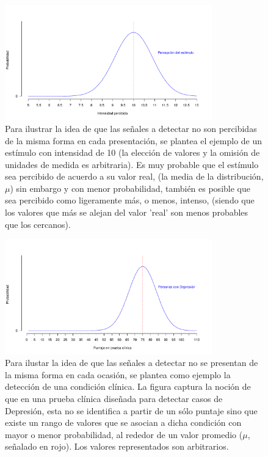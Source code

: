 \begin{itemize}
\begin{itemize}
\begin{figure}[th]
\centering
\includegraphics[width=0.80\textwidth]{Figures/Signal_Perception} 
\caption[Variabilidad en la percepción de los estímulos]{Para ilustrar la idea de que las señales a detectar no son percibidas de la misma forma en cada presentación, se plantea el ejemplo de un estímulo con intensidad de 10 (la elección de valores y la omisión de unidades de medida es arbitraria). Es muy probable que el estímulo sea percibido de acuerdo a su valor real, (la media de la distribución, $\mu$) sin embargo y con menor probabilidad, también es posible que sea percibido como ligeramente más, o menos, intenso, (siendo que los valores que más se alejan del valor 'real' son menos probables que los cercanos).}
\label{fig:Senal_percepcion}
\end{figure}

\begin{figure}[th]
\centering
\includegraphics[width=0.80\textwidth]{Figures/Signal_Presentation} 
\caption[Variabilidad en la presentación de los estímulos]{Para ilustar la idea de que las señales a detectar no se presentan de la misma forma en cada ocasión, se plantea como ejemplo la detección de una condición clínica. La figura captura la noción de que en una prueba clínica diseñada para detectar casos de Depresión, esta no se identifica a partir de un sólo puntaje sino que existe un rango de valores que se asocian a dicha condición con mayor o menor probabilidad, al rededor de un valor promedio ($\mu$, señalado en rojo). Los valores representados son arbitrarios.}
\label{fig:Senal_presentacion}
\end{figure}


\end{itemize}
\end{itemize}
